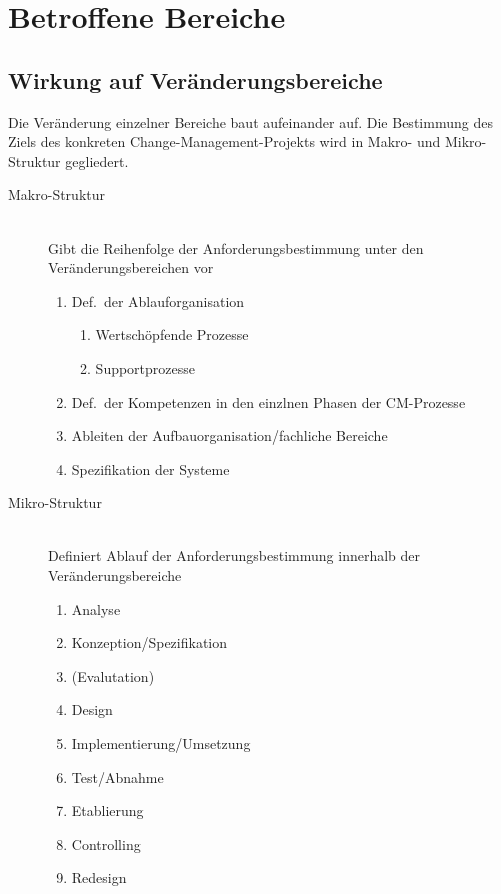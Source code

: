 \documentclass[a4paper, 12pt]{article}
\begin{document}
\section{Betroffene Bereiche}


\subsection{Wirkung auf Veränderungsbereiche}
Die Veränderung einzelner Bereiche baut aufeinander auf. Die Bestimmung des Ziels des konkreten Change-Management-Projekts wird in Makro- und Mikro-Struktur gegliedert.
\begin{description}
  \item[Makro-Struktur]~\\
    Gibt die Reihenfolge der Anforderungsbestimmung unter den Veränderungsbereichen vor
    \begin{enumerate}
      \item Def.\ der Ablauforganisation
        \begin{enumerate}
          \item Wertschöpfende Prozesse
          \item Supportprozesse
        \end{enumerate}
      \item Def.\ der Kompetenzen in den einzlnen Phasen der CM-Prozesse
      \item Ableiten der Aufbauorganisation/fachliche Bereiche
      \item Spezifikation der Systeme
    \end{enumerate}
  \item[Mikro-Struktur]~\\
    Definiert Ablauf der Anforderungsbestimmung innerhalb der Veränderungsbereiche
    \begin{enumerate}
      \item Analyse
      \item Konzeption/Spezifikation
      \item (Evalutation)
      \item Design
      \item Implementierung/Umsetzung
      \item Test/Abnahme
      \item Etablierung
      \item Controlling
      \item Redesign
    \end{enumerate}
\end{description}
\end{document}
